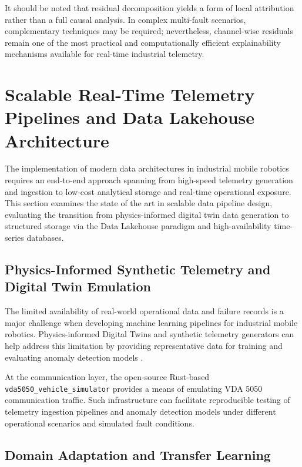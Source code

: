 It should be noted that residual decomposition yields a form of local attribution rather than a full causal analysis.
In complex multi-fault scenarios, complementary techniques may be required; nevertheless, channel-wise residuals remain one of the most practical and computationally efficient explainability mechanisms available for real-time industrial telemetry.

\section{Scalable Real-Time Telemetry Pipelines and Data Lakehouse Architecture}
\label{sec:data-pipeline-lakehouse}

The implementation of modern data architectures in industrial mobile robotics requires an end-to-end approach spanning from high-speed telemetry generation and ingestion to low-cost analytical storage and real-time operational exposure.
This section examines the state of the art in scalable data pipeline design, evaluating the transition from physics-informed digital twin data generation to structured storage via the Data Lakehouse paradigm and high-availability time-series databases.

\subsection{Physics-Informed Synthetic Telemetry and Digital Twin Emulation}
\label{sec:physics_informed_telemetry}

The limited availability of real-world operational data and failure records is a major challenge when developing machine learning pipelines for industrial mobile robotics.
Physics-informed Digital Twins and synthetic telemetry generators can help address this limitation by providing representative data for training and evaluating anomaly detection models \cite{mccourt2024digital,esrel2025fault}.

At the communication layer, the open-source Rust-based \texttt{vda5050\_vehicle\_simulator} \cite{bostanciVda5050} provides a means of emulating VDA 5050 communication traffic.
Such infrastructure can facilitate reproducible testing of telemetry ingestion pipelines and anomaly detection models under different operational scenarios and simulated fault conditions.

\subsection{Domain Adaptation and Transfer Learning}
\label{sec:domain_adaptation}

